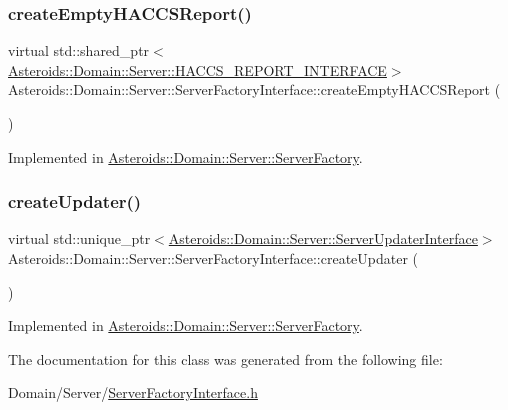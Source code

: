 \subsubsection{\texorpdfstring{create\+Empty\+H\+A\+C\+C\+S\+Report()}{createEmptyHACCSReport()}}
{\footnotesize\ttfamily virtual std\+::shared\+\_\+ptr$<$\hyperlink{classAsteroids_1_1Domain_1_1Server_1_1HACCS__REPORT__INTERFACE}{Asteroids\+::\+Domain\+::\+Server\+::\+H\+A\+C\+C\+S\+\_\+\+R\+E\+P\+O\+R\+T\+\_\+\+I\+N\+T\+E\+R\+F\+A\+CE}$>$ Asteroids\+::\+Domain\+::\+Server\+::\+Server\+Factory\+Interface\+::create\+Empty\+H\+A\+C\+C\+S\+Report (\begin{DoxyParamCaption}{ }\end{DoxyParamCaption})\hspace{0.3cm}{\ttfamily [pure virtual]}}



Implemented in \hyperlink{classAsteroids_1_1Domain_1_1Server_1_1ServerFactory_ab02d2953b438f3532f183d640f5391ec}{Asteroids\+::\+Domain\+::\+Server\+::\+Server\+Factory}.

\mbox{\label{classAsteroids_1_1Domain_1_1Server_1_1ServerFactoryInterface_a08286f1ac8f12fb63eeadeedad7d6d9b}} 
\subsubsection{\texorpdfstring{create\+Updater()}{createUpdater()}}
{\footnotesize\ttfamily virtual std\+::unique\+\_\+ptr$<$\hyperlink{classAsteroids_1_1Domain_1_1Server_1_1ServerUpdaterInterface}{Asteroids\+::\+Domain\+::\+Server\+::\+Server\+Updater\+Interface}$>$ Asteroids\+::\+Domain\+::\+Server\+::\+Server\+Factory\+Interface\+::create\+Updater (\begin{DoxyParamCaption}{ }\end{DoxyParamCaption})\hspace{0.3cm}{\ttfamily [pure virtual]}}



Implemented in \hyperlink{classAsteroids_1_1Domain_1_1Server_1_1ServerFactory_a151bf3c05e01e2f0d288a3aa97cbfec0}{Asteroids\+::\+Domain\+::\+Server\+::\+Server\+Factory}.



The documentation for this class was generated from the following file\+:\begin{DoxyCompactItemize}
\item 
Domain/\+Server/\hyperlink{ServerFactoryInterface_8h}{Server\+Factory\+Interface.\+h}\end{DoxyCompactItemize}
